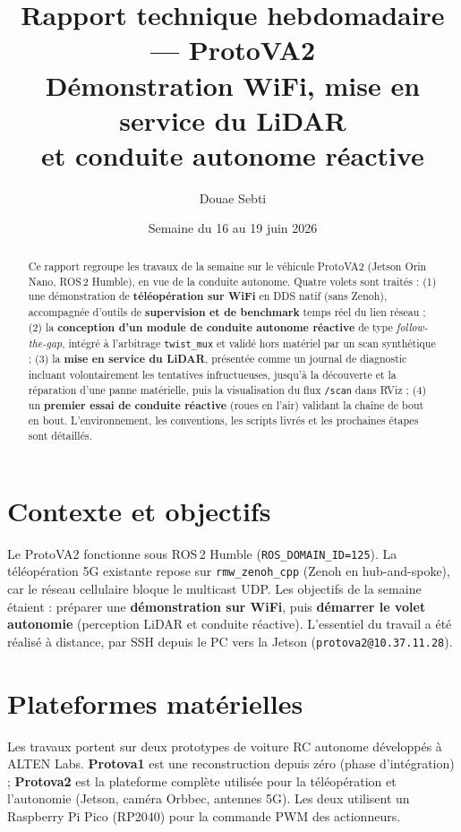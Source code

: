 \documentclass[a4paper,11pt]{article}
\title{\textbf{Rapport technique hebdomadaire --- ProtoVA2}\\[2mm]
\large Démonstration WiFi, mise en service du LiDAR\\ et conduite autonome réactive}
\author{Douae Sebti}
\date{Semaine du 16 au 19 juin 2026}
\begin{document}
\maketitle

\begin{abstract}
\noindent Ce rapport regroupe les travaux de la semaine sur le véhicule ProtoVA2
(Jetson Orin Nano, ROS\,2 Humble), en vue de la conduite autonome. Quatre volets
sont traités : (1) une démonstration de \textbf{téléopération sur WiFi} en DDS
natif (sans Zenoh), accompagnée d'outils de \textbf{supervision et de benchmark}
temps réel du lien réseau ; (2) la \textbf{conception d'un module de conduite autonome
réactive} de type \emph{follow-the-gap}, intégré à l'arbitrage \texttt{twist\_mux}
et validé hors matériel par un scan synthétique ; (3) la \textbf{mise en service
du LiDAR}, présentée comme un journal de diagnostic incluant volontairement les
tentatives infructueuses, jusqu'à la découverte et la réparation d'une panne
matérielle, puis la visualisation du flux \texttt{/scan} dans RViz ; (4) un
\textbf{premier essai de conduite réactive} (roues en l'air) validant la chaîne
de bout en bout. L'environnement, les conventions, les scripts livrés et les
prochaines étapes sont détaillés.
\end{abstract}

\tableofcontents
\bigskip

\section{Contexte et objectifs}
Le ProtoVA2 fonctionne sous ROS\,2 Humble (\texttt{ROS\_DOMAIN\_ID=125}). La
téléopération 5G existante repose sur \texttt{rmw\_zenoh\_cpp} (Zenoh en
hub-and-spoke), car le réseau cellulaire bloque le multicast UDP. Les objectifs
de la semaine étaient : préparer une \textbf{démonstration sur WiFi}, puis
\textbf{démarrer le volet autonomie} (perception LiDAR et conduite réactive).
L'essentiel du travail a été réalisé à distance, par SSH depuis le PC vers la
Jetson (\texttt{protova2@10.37.11.28}).

\section{Plateformes matérielles}
Les travaux portent sur deux prototypes de voiture RC autonome développés à
ALTEN Labs. \textbf{Protova1} est une reconstruction depuis zéro (phase
d'intégration) ; \textbf{Protova2} est la plateforme complète utilisée pour la
téléopération et l'autonomie (Jetson, caméra Orbbec, antennes 5G). Les deux
utilisent un Raspberry Pi Pico (RP2040) pour la commande PWM des actionneurs.
\end{document}
